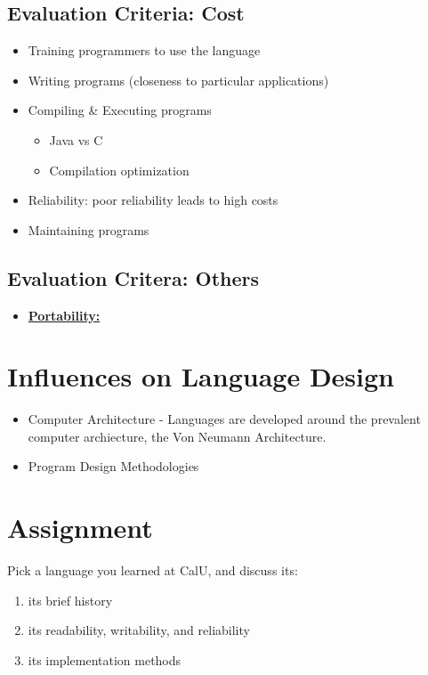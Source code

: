 \documentclass[12pt]{article}
\newcommand{\definition}[1]{\underline{\textbf{#1}}}
\begin{document}
\subsection*{Evaluation Criteria: Cost}

\begin{itemize}
    \item Training programmers to use the language
    \item Writing programs (closeness to particular applications)
    \item Compiling \& Executing programs
    \begin{itemize}
        \item Java vs C
        \item Compilation optimization
    \end{itemize}
    \item Reliability: poor reliability leads to high costs
    \item Maintaining programs
\end{itemize}


\subsection*{Evaluation Critera: Others}

\begin{itemize}
    \item \definition{Portability:}
\end{itemize}


\section*{Influences on Language Design}

\begin{itemize}
    \item Computer Architecture - Languages are developed around the prevalent computer archiecture, the Von Neumann Architecture.
    \item Program Design Methodologies
\end{itemize}


\section*{Assignment}

Pick a language you learned at CalU, and discuss its:
\begin{enumerate}
    \item its brief history
    \item its readability, writability, and reliability
    \item its implementation methods
\end{enumerate}
\end{document}
